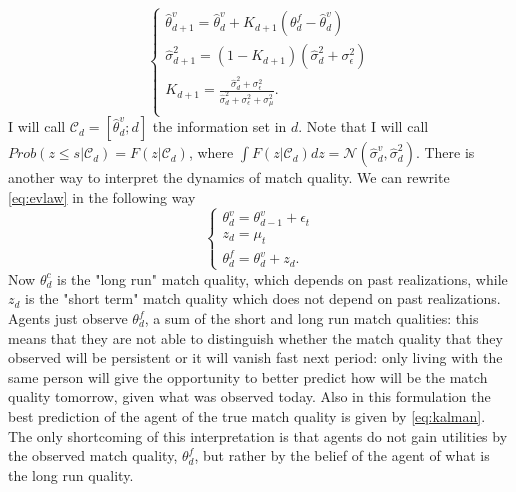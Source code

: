 \documentclass[12pt]{article}
\begin{document}
\begin{equation}\label{eq:kalman}
\begin{cases}
\hat{\theta}^v_{d+1}=\hat{\theta}^v_d+ K_{d+1}(\theta^f_d-\hat{\theta}^v_d)\\
\hat{\sigma}_{d+1}^2=(1-K_{d+1})(\hat{\sigma}_{d}^2+\sigma^2_\epsilon)\\
K_{d+1}=\frac{\hat{\sigma}_{d}^2+\sigma^2_\epsilon}{\hat{\sigma}_{d}^2+\sigma^2_\epsilon+\sigma_{\mu}^2}.\\
\end{cases}
\end{equation}
 I will call $\mathcal{C}_d=[\hat{\theta}^v_d;d]$ the information set in $d$. Note that I will call $Prob({z\leq s|\mathcal{C}_d})=F(z|\mathcal{C}_d)$, where $\int F(z|\mathcal{C}_d)dz=\mathcal{N}(\hat{\sigma}_d^v,\hat{\sigma}_{d}^2)$.
 There is another way to interpret the dynamics of match quality. We can rewrite \autoref{eq:evlaw} in the following way
 \begin{equation}\label{eq:evlaw2}
 \begin{cases}
 \theta^v_d=\theta^v_{d-1}+\epsilon_t\\
 z_d=\mu_t\\
 \theta^f_d=\theta^v_{d}+z_d.
 \end{cases}
 \end{equation}
 Now $\theta^c_d$ is the "long run" match quality, which depends on past realizations, while $z_d$ is the "short term" match quality which does not depend on past realizations. Agents just observe $\theta^f_d$, a sum of the short and long run match qualities: this means that they are not able to distinguish whether the match quality that they observed will be persistent or it will vanish fast next period: only living with the same person will give the opportunity to better predict how will be the match quality tomorrow, given what was observed today. Also in this formulation the best prediction of the agent of the true match quality is given by \autoref{eq:kalman}. The only shortcoming of this interpretation is that agents do not gain utilities by the observed match quality, $\theta^f_d$, but rather by the belief of the agent of what is the long run quality.
\end{document}
